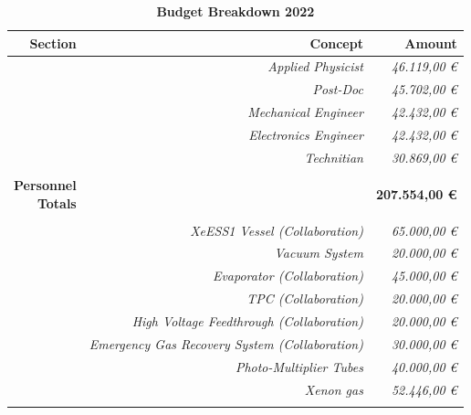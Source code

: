 \documentclass[12pt,a4paper,article]{report} %
\begin{document}
			
\begin{table}[htp]
\caption{\large{\textbf{Budget Breakdown 2022}}}
\begin{center}
\begin{tabular}{r   r  r}


\textbf{Section}&\textbf{Concept}& \textbf{Amount}  \\ \hline \hline

&{\footnotesize \emph{Applied Physicist} }& {\footnotesize \emph{46.119,00 \euro{} }}\\ 
&{\footnotesize \emph{Post-Doc} }& {\footnotesize \emph{45.702,00 \euro{} }}\\ 
&{\footnotesize \emph{Mechanical Engineer} }& {\footnotesize \emph{42.432,00  \euro{} }}  \\
&{\footnotesize \emph{Electronics Engineer} }& {\footnotesize \emph{42.432,00 \euro{} }}\\
&{\footnotesize \emph{Technitian} }& {\footnotesize \emph{30.869,00 \euro{} }}\\ \hline \\

\makecell[r] {\textbf{Personnel} \\  \textbf{Totals}}&& \textbf{207.554,00 \euro{}}  \\ \\ \hline\hline 

&{\footnotesize \emph{XeESS1 Vessel (Collaboration)} }& {\footnotesize \emph{65.000,00 \euro{}}}\\ 
&{\footnotesize \emph{Vacuum System} }& {\footnotesize \emph{20.000,00 \euro{}}} \\ 
&{\footnotesize \emph{Evaporator (Collaboration)} }& {\footnotesize \emph{45.000,00  \euro{} }} \\
&{\footnotesize \emph{TPC  (Collaboration)} }& {\footnotesize \emph{20.000,00 \euro{}}} \\
&{\footnotesize \emph{High Voltage Feedthrough  (Collaboration)}} & {\footnotesize \emph{20.000,00 \euro{} }}\\ 
&{\footnotesize \emph{Emergency Gas Recovery System  (Collaboration)}} & {\footnotesize \emph{30.000,00 \euro{} }}\\ 
&{\footnotesize \emph{Photo-Multiplier Tubes}} & {\footnotesize \emph{40.000,00 \euro{}}} \\ 
&{\footnotesize \emph{Xenon gas}} & {\footnotesize \emph{52.446,00 \euro{} }}\\ \hline \\


\end{tabular}
\end{center}
\end{table}
\end{document}
